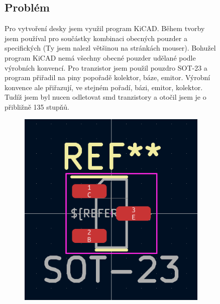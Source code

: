 \documentclass[12pt,a4paper]{article}
\begin{document}
\begin{figure}[H]
	\subsection{Problém}
	Pro vytvoření desky jsem využil program KiCAD. Během tvorby jsem používal pro součástky kombinaci obecných pouzder a specifických (Ty jsem nalezl většinou na stránkách mouser). Bohužel program KiCAD nemá všechny obecné pouzder udělané podle výrobních konvencí. Pro tranzistor jsem použil pouzdro SOT-23 a program přiřadil na piny popořadě kolektor, báze, emitor. Výrobní konvence ale přiřazují, ve stejném pořadí, bázi, emitor, kolektor. Tudíž jsem byl nucen odletovat smd tranzistory a otočil jsem je o přibližně 135 stupňů.


	\centering
	\begin{subfigure}[b]{0.49\textwidth}
	  \includegraphics[width=\textwidth]{pictures/wrong_npn.png}
	\end{subfigure}
	\centering
	\hfill
	\begin{subfigure}[b]{0.49\textwidth}

\end{subfigure}
\end{figure}
\end{document}
